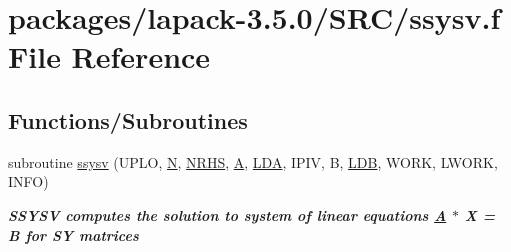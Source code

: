 \hypertarget{ssysv_8f}{}\section{packages/lapack-\/3.5.0/\+S\+R\+C/ssysv.f File Reference}
\label{ssysv_8f}
\subsection*{Functions/\+Subroutines}
\begin{DoxyCompactItemize}
\item 
subroutine \hyperlink{group__realSYsolve_gaebb5b9226b808303f3f80ca96cfe9388}{ssysv} (U\+P\+L\+O, \hyperlink{polmisc_8c_a0240ac851181b84ac374872dc5434ee4}{N}, \hyperlink{example__user_8c_aa0138da002ce2a90360df2f521eb3198}{N\+R\+H\+S}, \hyperlink{classA}{A}, \hyperlink{example__user_8c_ae946da542ce0db94dced19b2ecefd1aa}{L\+D\+A}, I\+P\+I\+V, B, \hyperlink{example__user_8c_a50e90a7104df172b5a89a06c47fcca04}{L\+D\+B}, W\+O\+R\+K, L\+W\+O\+R\+K, I\+N\+F\+O)
\begin{DoxyCompactList}\small\item\em {\bfseries  S\+S\+Y\+S\+V computes the solution to system of linear equations \hyperlink{classA}{A} $\ast$ X = B for S\+Y matrices} \end{DoxyCompactList}\end{DoxyCompactItemize}
